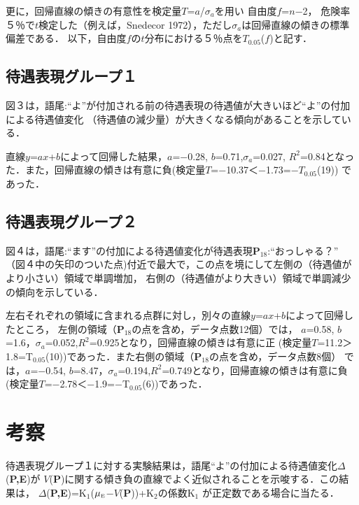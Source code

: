 更に，回帰直線の傾きの有意性を検定量\(T\)=\(a\)/\(\sigma_{a}\)\hspace{-0.25mm}を用い
自由度\hspace{-0.25mm}\(f\)=\(n\)−2，
危険率５％で\(t\)検定した（例えば，Snedecor 1972），ただし\hspace{-0.12mm}\(\sigma_{a}\)\hspace{-0.12mm}は回帰直線の傾きの標準偏差である．
以下，自由度\(f\)の\(t\)分布における５％点を\(T\)\(_{0.05}\)(\(f\))と記す．

\subsection{待遇表現グループ１}
図３は，語尾:``よ''が付加される前の待遇表現の待遇値が大きいほど``よ''の付加による待遇値変化
（待遇値の減少量）が大きくなる傾向があることを示している．

直線\(y\)=\(a\)\(x\)+\(b\)によって回帰した結果，\(a\)=−0.28, \(b\)=0.71,\(\sigma_{a}\)=0.027, 
\(R^{2}\)=0.84となった．また，回帰直線の傾きは有意に負(検定量\(T\)=−10.37＜−1.73=−\(T\)\(_{0.05}\)(19))
であった．
\subsection{待遇表現グループ２}
図４は，語尾:``ます''の付加による待遇値変化が待遇表現{\bf P}\(_{18}\):``おっしゃる？''
（図４中の矢印のついた点)付近で最大で，この点を境にして左側の（待遇値がより小さい）領域で単調増加，
右側の（待遇値がより大きい）領域で単調減少の傾向を示している．

左右それぞれの領域に含まれる点群に対し，別々の直線\(y\)=\(a\)\(x\)+\(b\)によって回帰したところ，
左側の領域（{\bf P}\(_{18}\)\hspace{-0.25mm}の点を含め，データ点数12個）では，
\(a\)=0.58, \(b\)=1.6，\(\sigma_{a}\)=0.052,\(R^{2}\)=0.925となり，回帰直線の傾きは有意に正
(検定量\(T\)=11.2＞1.8=T\(_{0.05}\)(10))であった．また右側の領域（{\bf P}\(_{18}\)の点を含め，データ点数8個）
では，\(a\)=−0.54, \(b\)=8.47，\(\sigma_{a}\)=0.194,\(R^{2}\)=0.749となり，回帰直線の傾きは有意に負
(検定量\(T\)=−2.78＜−1.9=−T\(_{0.05}\)(6))であった．

\section{考察}
待遇表現グループ１に対する実験結果は，語尾``よ''の付加による待遇値変化\(\Delta\)({\bf P,E})が
\(V\)({\bf P})に関する傾き負の直線でよく近似されることを示唆する．この結果は， 
\(\Delta\)({\bf P,E})=K\(_{1}\)(\(\mu_{\mbox{\tiny{E}}}\)−\(V\)({\bf P}))+K\(_{2}\)の係数K\(_{1}\)
が正定数である場合に当たる．

